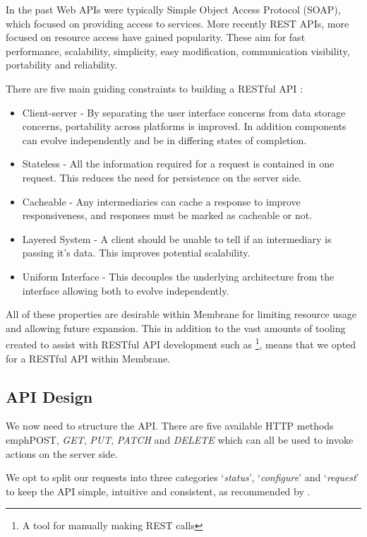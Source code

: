 \documentclass[11pt, a4paper, twoside]{report}
\begin{document}
In the past Web APIs were typically Simple Object Access Protocol (SOAP), which focused on providing access to services. \citep{benslimane2008services} More recently REST APIs, more focused on resource access have gained popularity. These aim for fast performance, scalability, simplicity, easy modification, communication visibility, portability and reliability. \citep{fielding2000architectural}

There are five main guiding constraints to building a RESTful API \citep{fielding2000architectural}: 

\begin{itemize}
 \item Client-server - By separating the user interface concerns from data storage concerns, portability across platforms is improved. In addition components can evolve independently and be in differing states of completion.
 \item Stateless - All the information required for a request is contained in one request. This reduces the need for persistence on the server side.
 \item Cacheable - Any intermediaries can cache a response to improve responsiveness, and responses must be marked as cacheable or not.
 \item Layered System - A client should be unable to tell if an intermediary is passing it's data. This improves potential scalability.
 \item Uniform Interface - This decouples the underlying architecture from the interface allowing both to evolve independently.
\end{itemize}

All of these properties are desirable within Membrane for limiting resource usage and allowing future expansion. This in addition to the vast amounts of tooling created to assist with RESTful API development such as \cite{postman2017api}\footnote{A tool for manually making REST calls}, means that we opted for a RESTful API within Membrane.

\subsection{API Design}

We now need to structure the API. There are five available HTTP methods emph{POST}, \emph{GET}, \emph{PUT}, \emph{PATCH} and \emph{DELETE} which can all be used to invoke actions on the server side.

We opt to split our requests into three categories `\emph{status}', `\emph{configure}' and `\emph{request}' to keep the API simple, intuitive and consistent, as recommended by \cite{google2017api}.
\end{document}

